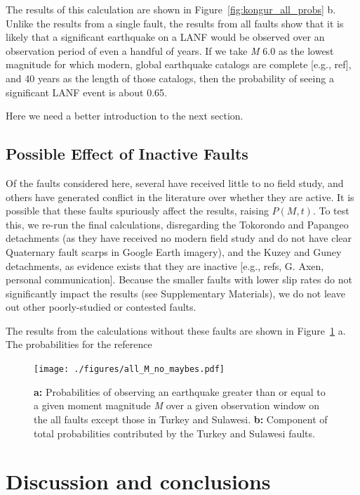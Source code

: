 \documentclass[twocolumn,grl]{AGUTeX}
\begin{document}
\begin{article}
The results of this calculation are shown in Figure~\ref{fig:kongur_all_probs} b.  Unlike the results from a single fault, the results from all faults show that it is likely that a significant earthquake on a LANF would be observed over an observation period of even a handful of years.  If we take \emph{M} 6.0 as the lowest magnitude for which modern, global earthquake catalogs are complete [e.g., ref], and 40 years as the length of those catalogs, then the probability of seeing a significant LANF event is about 0.65.

Here we need a better introduction to the next section.

\subsection{Possible Effect of Inactive Faults}
Of the faults considered here, several have received little to no field study, and others have generated conflict in the literature over whether they are active.  It is possible that these faults spuriously affect the results, raising $P(M,t)$.  To test this, we re-run the final calculations, disregarding the Tokorondo and Papangeo detachments (as they have received no modern field study and do not have clear Quaternary fault scarps in Google Earth imagery), and the Kuzey and Guney detachments, as evidence exists that they are inactive [e.g., refs, G. Axen, personal communication].  Because the smaller faults with lower slip rates do not significantly impact the results (see Supplementary Materials), we do not leave out other poorly-studied or contested faults.
	
The results from the calculations without these faults are shown in Figure~\ref{fig:all_probs_no_maybes} a. The probabilities for the reference  


\begin{figure}%
\noindent\texttt{[image: ./figures/all\_M\_no\_maybes.pdf]}
\caption{\textbf{a:} Probabilities of observing an earthquake greater than or equal to a given moment magnitude \emph{M} over a given observation window on the all faults except those in Turkey and Sulawesi. \textbf{b:} Component of total probabilities contributed by the Turkey and Sulawesi faults.}
\label{fig:all_probs_no_maybes}
\end{figure}


\section{Discussion and conclusions}


\end{article}
\end{document}
